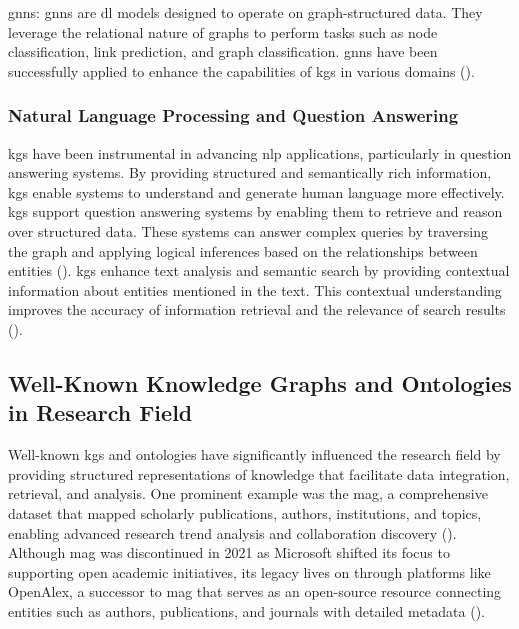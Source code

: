 \glspl{gnn}: \glspl{gnn} are \gls{dl} models designed to operate on graph-structured data. They leverage the relational nature of graphs to perform tasks such as node classification, link prediction, and graph classification. \glspl{gnn} have been successfully applied to enhance the capabilities of \glspl{kg} in various domains (\cite{Wu2021}).

\subsubsection*{Natural Language Processing and Question Answering}
\glspl{kg} have been instrumental in advancing \gls{nlp} applications, particularly in question answering systems. By providing structured and semantically rich information, \glspl{kg} enable systems to understand and generate human language more effectively.
\glspl{kg} support question answering systems by enabling them to retrieve and reason over structured data.
These systems can answer complex queries by traversing the graph and applying logical inferences based on the relationships between entities (\cite{Yasunaga2021}).
\glspl{kg} enhance text analysis and semantic search by providing contextual information about entities mentioned in the text.
This contextual understanding improves the accuracy of information retrieval and the relevance of search results (\cite{Fernandez2011}).

\subsection*{Well-Known Knowledge Graphs and Ontologies in Research Field}
Well-known \glspl{kg} and ontologies have significantly influenced the research field by providing structured representations of knowledge that facilitate data integration, retrieval, and analysis.
One prominent example was the \gls{mag}, a comprehensive dataset that mapped scholarly publications, authors, institutions, and topics, enabling advanced research trend analysis and collaboration discovery (\cite{Wang2020}). Although \gls{mag} was discontinued in 2021 as Microsoft shifted its focus to supporting open academic initiatives, its legacy lives on through platforms like OpenAlex, a successor to \gls{mag} that serves as an open-source resource connecting entities such as authors, publications, and journals with detailed metadata (\cite{priem2022}).

